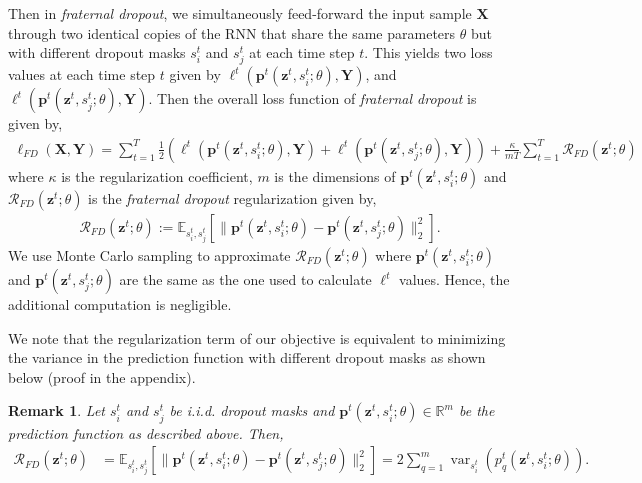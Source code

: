 \documentclass{article} %
\newtheorem{remark}{Remark}
\DeclareMathOperator{\var}{var}
\begin{document}
Then in \emph{fraternal dropout}, we simultaneously feed-forward the input sample $\mathbf{X}$ through two identical copies of the RNN that share the same parameters $\theta$ but with different dropout masks $s_i^t$ and $s_j^t$ at each time step $t$. This yields two loss values at each time step $t$ given by $\ell^t(\mathbf{p}^t(\mathbf{z}^t, s_i^t; \theta),\mathbf{Y})$, and $\ell^t(\mathbf{p}^t(\mathbf{z}^t, s_j^t; \theta),\mathbf{Y})$. Then the overall loss function of \emph{fraternal dropout} is given by,
\begin{align}
\ell_{FD}(\mathbf{X}, \mathbf{Y}) = \sum_{t=1}^T \frac{1}{2} \left( \ell^t(\mathbf{p}^t(\mathbf{z}^{t}, s_i^t; \theta),\mathbf{Y})  + \ell^t(\mathbf{p}^t(\mathbf{z}^{t}, s_j^t; \theta),\mathbf{Y})  \right) + \frac{\kappa}{mT}  \sum_{t=1}^T  \mathcal{R}_{FD}(\mathbf{z}^{t}; \theta)
\end{align}
where $\kappa$ is the regularization coefficient, $ m$ is the dimensions of $\mathbf{p}^t(\mathbf{z}^{t}, s_i^t; \theta)$ and $\mathcal{R}_{FD}(\mathbf{z}^{t}; \theta)$ is the \emph{fraternal dropout} regularization given by,
\begin{align}
\mathcal{R}_{FD}(\mathbf{z}^{t}; \theta) := \mathbb{E}_{s_i^t, s_j^t} \left[ \lVert \mathbf{p}^t(\mathbf{z}^{t}, s_i^t; \theta) - \mathbf{p}^t(\mathbf{z}^{t}, s_j^t; \theta) \rVert^2_2 \right].
\end{align}
We use Monte Carlo sampling to approximate $\mathcal{R}_{FD}(\mathbf{z}^{t}; \theta)$ where $\mathbf{p}^t(\mathbf{z}^{t}, s_i^t; \theta)$ and $\mathbf{p}^t(\mathbf{z}^{t}, s_j^t; \theta)$ are the same as the one used to calculate $\ell^t$ values. Hence, the additional computation is negligible.

We note that the regularization term of our objective is equivalent to minimizing the variance in the prediction function with different dropout masks as shown below (proof in the appendix).
\begin{remark}
\label{remark_var}
Let $s_i^t$ and $s_j^t$ be i.i.d. dropout masks and $\mathbf{p}^t(\mathbf{z}^t, s_i^t; \theta) \in \mathbb{R}^m$ be the prediction function as described above. Then, 
\begin{align}
\mathcal{R}_{FD}(\mathbf{z}^{t}; \theta) &= \mathbb{E}_{s_i^t, s_j^t} \left[ \lVert \mathbf{p}^t(\mathbf{z}^t, s_i^t; \theta) - \mathbf{p}^t(\mathbf{z}^t, s_j^t; \theta) \rVert^2_2 \right] = 2\sum_{q=1}^{m} \var_{s_i^t}( {p}_q^t(\mathbf{z}^t, s_i^t; \theta) ).
\end{align}
\end{remark}
\end{document}

